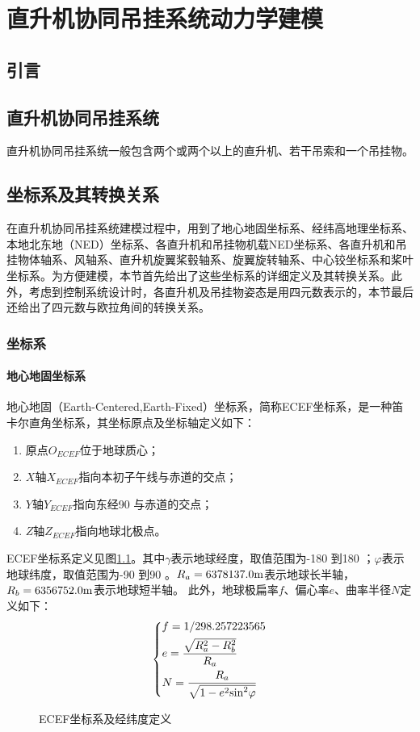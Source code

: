 \chapter{直升机协同吊挂系统动力学建模}
\section{引言}
\section{直升机协同吊挂系统}
直升机协同吊挂系统一般包含两个或两个以上的直升机、若干吊索和一个吊挂物。
\section{坐标系及其转换关系}
在直升机协同吊挂系统建模过程中，用到了地心地固坐标系、经纬高地理坐标系、本地北东地（NED）坐标系、各直升机和吊挂物机载NED坐标系、各直升机和吊挂物体轴系、风轴系、直升机旋翼桨毂轴系、旋翼旋转轴系、中心铰坐标系和桨叶坐标系。为方便建模，本节首先给出了这些坐标系的详细定义及其转换关系。此外，考虑到控制系统设计时，各直升机及吊挂物姿态是用四元数表示的，本节最后还给出了四元数与欧拉角间的转换关系。
\subsection{坐标系}
\subsubsection{地心地固坐标系}
地心地固（Earth-Centered,Earth-Fixed）坐标系，简称ECEF坐标系，是一种笛卡尔直角坐标系，其坐标原点及坐标轴定义如下：
\begin{enumerate}
  \item 原点$O_{ECEF}$位于地球质心；
  \item $X$轴$X_{ECEF}$指向本初子午线与赤道的交点；
  \item $Y$轴$Y_{ECEF}$指向东经90 \degree 与赤道的交点；
  \item $Z$轴$Z_{ECEF}$指向地球北极点。
\end{enumerate}

ECEF坐标系定义见图\ref{ECEF}。其中$\gamma$表示地球经度，取值范围为-180 \degree 到180 \degree ；$\varphi$表示地球纬度，取值范围为-90 \degree 到90 \degree 。$R_a = 6378137.0 \rm{m}$表示地球长半轴，$R_b = 6356752.0 \rm{m}$表示地球短半轴。
此外，地球极扁率$f$、偏心率$e$、曲率半径$N$定义如下：
\begin{equation}
  \left\{ \begin{gathered}
    f = 1/298.257223565 \hfill \\
    e = \frac{{\sqrt {{R_a^2} - {R_b^2}} }}{R_a} \hfill \\
    N = \frac{R_a}{{\sqrt {1 - {e^2}{{\sin }^2}\varphi } }} \hfill \\ 
  \end{gathered}  \right.
\end{equation}
\begin{figure}[htb!]
  
  \caption{ECEF坐标系及经纬度定义\label{ECEF}}
\end{figure}

